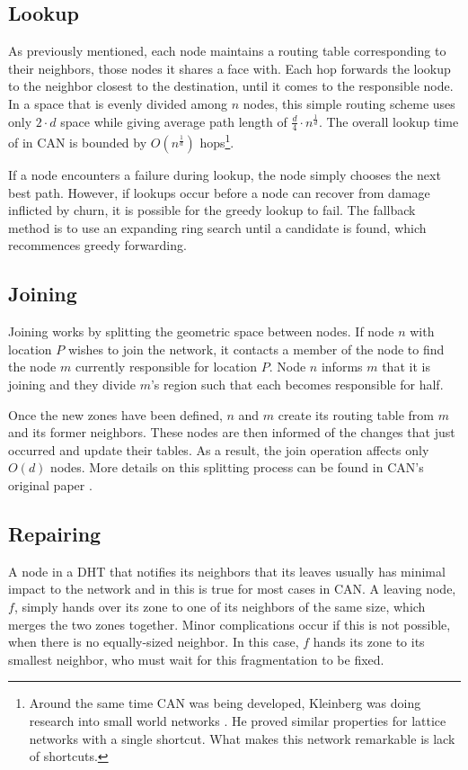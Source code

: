 \subsection*{Lookup}
As previously mentioned, each node maintains a routing table corresponding to their neighbors, those nodes it shares a face with.
Each hop forwards the lookup to the neighbor closest to the destination, until it comes to the responsible node.
In a space that is evenly divided among $n$ nodes, this simple routing scheme uses only $2 \cdot d$ space while giving average path length of $\frac{d}{4}\cdot n^{\frac{1}{d}}$.
The overall lookup time of in CAN is bounded by $O(n^{\frac{1}{d}})$ hops\footnote{Around the same time CAN was being developed, Kleinberg was doing research into small world networks \cite{kleinberg2000small}.  
He proved similar properties for lattice networks with a single shortcut.  What makes this network remarkable is lack of shortcuts.}.

If a node encounters a failure during lookup, the node simply chooses the next best path.
However, if lookups occur before a node can recover from damage inflicted by churn, it is possible for the greedy lookup to fail.
The fallback method is to use an expanding ring search until a candidate is found, which recommences greedy forwarding.

\subsection*{Joining}
Joining works by splitting the geometric space between nodes.  
If node $n$ with location $P$ wishes to join the network, it contacts a member of the node to find the node $m$ currently responsible for location $P$.
Node $n$ informs $m$ that it is joining and they divide $m$'s region such that each becomes responsible for half.

Once the new zones have been defined, $n$ and $m$ create its routing table from $m$ and its former neighbors.
These nodes are then informed of the changes that just occurred and update their tables.
As a result, the join operation affects only $O(d)$ nodes.  
More details on this splitting process can be found in CAN's original paper \cite{can}.

\subsection*{Repairing}
A node in a DHT that notifies its neighbors that its leaves usually has minimal impact to the  network and in this is true for most cases in CAN.
A leaving node, $f$, simply hands over its zone to one of its neighbors of the same size, which merges the two zones together.
Minor complications occur if this is not possible, when there is no equally-sized neighbor. 
In this case, $f$ hands its zone to its smallest neighbor, who must wait for this fragmentation to be fixed.



